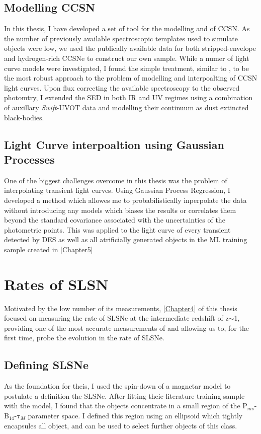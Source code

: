 \subsection{Modelling CCSN}
In this thesis, I have developed a set of tool for the modelling and of CCSN. As the number of previously available spectroscopic templates used to simulate objects were low, we used the publically available data for both stripped-envelope and hydrogen-rich CCSNe to construct our own sample. While a numer of light curve models were investigated, I found the simple treatment, similar to \citet{Bazin2009}, to be the most robust approach to the problem of modelling and interpoalting of CCSN light curves. Upon flux correcting the available spectroscopy to the observed photomtry, I extended the SED in both IR and UV regimes using a combination of auxillary \textit{Swift}-UVOT data and modelling their continuum as dust extincted black-bodies. 

\subsection{Light Curve interpoaltion using Gaussian Processes}
One of the biggest challenges overcome in this thesis was the problem of interpolating transient light curves. Using Gaussian Process Regression, I developed a method which allowes me to probabilistically inperpolate the data without introducing any models which biases the results or correlates them beyond the standard covariance associated with the uncertainties of the photometric points. This was applied to the light curve of every transient detected by DES as well as all atrificially generated objects in the ML training sample created in \cref{Chapter5}

\section{Rates of SLSN}
Motivated by the low number of its measurements, \cref{Chapter4} of this thesis focused on measuring the rate of SLSNe at the intermediate redshift of z$\sim$1, providing one of the most accurate measurements of and allowing us to, for the first time, probe the evolution in the rate of SLSNe.

\subsection{Defining SLSNe}
As the foundation for theis, I used the spin-down of a magnetar model to postulate a definition the SLSNe. After fitting theie literature training sample with the model, I found that the objects concentrate in a small region of the P$_{ms}$-B$_{14}$-$\mathrm{\tau}_M$ parameter space. I defined this region using an ellipsoid which tightly encapsules all object, and can be used to select further objects of this class.

